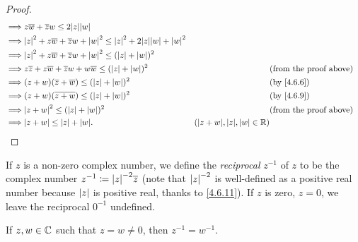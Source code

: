 \begin{proof}
\begin{align*}
    \implies & z \overline{w} + \overline{z} w \leq 2 \abs{z} \abs{w}                                                                                                                          \\
    \implies & \abs{z}^2 + z \overline{w} + \overline{z} w + \abs{w}^2 \leq \abs{z}^2 + 2 \abs{z} \abs{w} + \abs{w}^2                                                                          \\
    \implies & \abs{z}^2 + z \overline{w} + \overline{z} w + \abs{w}^2 \leq (\abs{z} + \abs{w})^2                                                                                              \\
    \implies & z \overline{z} + z \overline{w} + \overline{z} w + w \overline{w} \leq (\abs{z} + \abs{w})^2           &                                        & \text{(from the proof above)} \\
    \implies & (z + w) (\overline{z} + \overline{w}) \leq (\abs{z} + \abs{w})^2                                       &                                        & \by{4.6.6}                    \\
    \implies & (z + w) (\overline{z + w}) \leq (\abs{z} + \abs{w})^2                                                  &                                        & \by{4.6.9}                    \\
    \implies & \abs{z + w}^2 \leq (\abs{z} + \abs{w})^2                                                               &                                        & \text{(from the proof above)} \\
    \implies & \abs{z + w} \leq \abs{z} + \abs{w}.                                                                    & (\abs{z + w}, \abs{z}, \abs{w} \in \R)
  \end{align*}
\end{proof}

\begin{defn}\label{4.6.12}
  If \(z\) is a non-zero complex number, we define the \emph{reciprocal} \(z^{-1}\) of \(z\) to be the complex number \(z^{-1} \coloneqq \abs{z}^{-2} \overline{z}\)
  (note that \(\left\lvert z\right\rvert^{-2}\) is well-defined as a positive real number because \(\left\lvert z\right\rvert\) is positive real, thanks to \cref{4.6.11}).
  If \(z\) is zero, \(z = 0\), we leave the reciprocal \(0^{-1}\) undefined.
\end{defn}

\begin{ac}\label{ac:4.6.5}
  If \(z, w \in \mathbb{C}\) such that \(z = w \neq 0\), then \(z^{-1} = w^{-1}\).
\end{ac}

